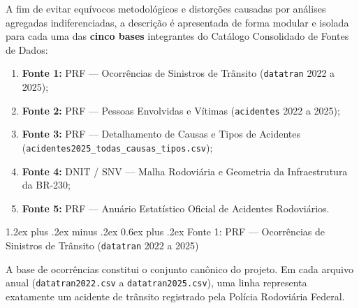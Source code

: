 \documentclass[11pt,a4paper]{article}
\makeatletter
\renewcommand\subsection{
\@startsection{subsection}{2}{0pt}%
{1.2ex plus .2ex minus .2ex}%
{0.6ex plus .2ex}%
{\normalfont\large\bfseries\color{secondary}}
}
\makeatother
\begin{document}
A fim de evitar equívocos metodológicos e distorções causadas por análises agregadas indiferenciadas, a descrição é apresentada de forma modular e isolada para cada uma das \textbf{cinco bases} integrantes do Catálogo Consolidado de Fontes de Dados:
\begin{enumerate}
    \item \textbf{Fonte 1:} PRF --- Ocorrências de Sinistros de Trânsito (\texttt{datatran} 2022 a 2025);
    \item \textbf{Fonte 2:} PRF --- Pessoas Envolvidas e Vítimas (\texttt{acidentes} 2022 a 2025);
    \item \textbf{Fonte 3:} PRF --- Detalhamento de Causas e Tipos de Acidentes (\texttt{acidentes2025\_todas\_causas\_tipos.csv});
    \item \textbf{Fonte 4:} DNIT / SNV --- Malha Rodoviária e Geometria da Infraestrutura da BR-230;
    \item \textbf{Fonte 5:} PRF --- Anuário Estatístico Oficial de Acidentes Rodoviários.
\end{enumerate}

\subsection{Fonte 1: PRF --- Ocorrências de Sinistros de Trânsito (\texttt{datatran} 2022 a 2025)}

A base de ocorrências constitui o conjunto canônico do projeto. Em cada arquivo anual (\texttt{datatran2022.csv} a \texttt{datatran2025.csv}), uma linha representa exatamente um acidente de trânsito registrado pela Polícia Rodoviária Federal.
\end{document}

